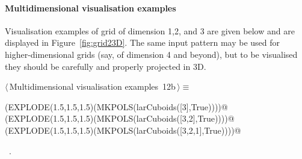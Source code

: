 \documentclass[11pt,oneside]{article}	%
\begin{document}
\paragraph{Multidimensional visualisation examples}
Visualisation examples of grid of dimension 1,2, and 3 are given below and are displayed  in Figure~\ref{fig:grid23D}. The same input pattern may be used for higher-dimensional grids (say, of dimension 4 and beyond), but to be visualised they should be carefully and properly projected in 3D.

\begin{flushleft} \small
\begin{minipage}{\linewidth} \label{scrap17}
\protect{}$\langle\,$Multidimensional visualisation examples\nobreak\ {\footnotesize 12b}$\,\rangle\equiv$
\vspace{-1ex}
\begin{list}{}{} \item
\mbox{}\verb@VIEW(EXPLODE(1.5,1.5,1.5)(MKPOLS(larCuboids([3],True))))@\\
\mbox{}\verb@VIEW(EXPLODE(1.5,1.5,1.5)(MKPOLS(larCuboids([3,2],True))))@\\
\mbox{}\verb@VIEW(EXPLODE(1.5,1.5,1.5)(MKPOLS(larCuboids([3,2,1],True))))@\\
\mbox{}\verb@@{\NWsep}
\end{list}
\vspace{-1ex}
\footnotesize\addtolength{\baselineskip}{-1ex}
\begin{list}{}{\setlength{\itemsep}{-\parsep}\setlength{\itemindent}{-\leftmargin}}
\item \NWtxtMacroRefIn\ .
\end{list}
\end{minipage}\\[4ex]
\end{flushleft}
\end{document}
